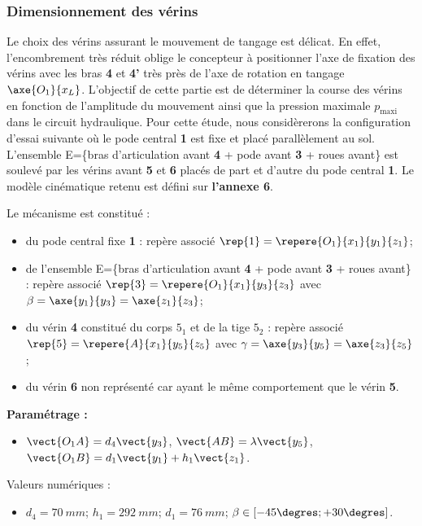 \subsubsection{Dimensionnement des vérins}
\ifprof
\else

Le choix des vérins assurant le mouvement de tangage est délicat. En effet, l’encombrement très réduit oblige le
concepteur à positionner l’axe de fixation des vérins avec les bras \textbf{4} et \textbf{4’} très près de l’axe de rotation en tangage $\axe{O_1}{x_L}$. L’objectif de cette partie est de déterminer la course des vérins en fonction de l’amplitude du mouvement ainsi que la pression maximale $p_{\text{maxi}}$ dans le circuit hydraulique. Pour cette étude, nous considèrerons la configuration d’essai suivante où le pode central \textbf{1} est fixe et placé parallèlement au sol. L’ensemble E=\{bras d’articulation avant \textbf{4} + pode avant \textbf{3} + roues avant\} est soulevé par les vérins avant \textbf{5} et \textbf{6} placés de part et d’autre du pode central \textbf{1}. Le modèle cinématique retenu est défini sur \textbf{l’annexe 6}.

Le mécanisme est constitué : 
\begin{itemize}
 \item du pode central fixe \textbf{1} : repère associé $\rep{1}=\repere{O_1}{x_1}{y_1}{z_1}$;
 \item de l'ensemble  E=\{bras d’articulation avant \textbf{4} + pode avant \textbf{3} + roues avant\} : repère associé $\rep{3}=\repere{O_1}{x_1}{y_3}{z_3}$ avec $\beta = \axe{y_1}{y_3} =\axe{z_1}{z_3}$;
 \item du vérin \textbf{4} constitué du corps \textbf{$5_1$} et de la tige \textbf{$5_2$} : repère associé $\rep{5}=\repere{A}{x_1}{y_5}{z_5}$ avec
  $\gamma = \axe{y_3}{y_5}= \axe{z_3}{z_5}$;
 \item du vérin \textbf{6} non représenté car ayant le même comportement que le vérin \textbf{5}.
\end{itemize}

\textbf{Paramétrage :}
\begin{itemize}
 \item $\vect{O_1 A}=d_4\vect{y_3}$, $\vect{AB}=\lambda\vect{y_5}$, $\vect{O_1 B}=d_1\vect{y_1}+h_1\vect{z_1}$.
\end{itemize}

Valeurs numériques : 
\begin{itemize}
 \item $d_4 =\SI{70}{mm}$; $h_1 =\SI{292}{mm}$; $d_1 =\SI{76}{mm}$; $\beta \in \left[ -45\degres;+30\degres\right]$.
\end{itemize}
\fi

